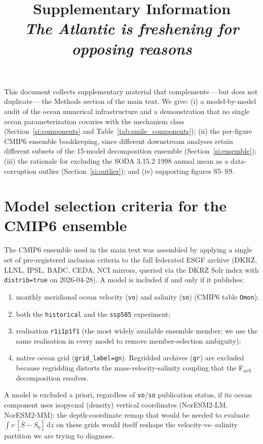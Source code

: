 \documentclass[10pt,a4paper]{article}
\title{Supplementary Information \\
       \textit{The Atlantic is freshening for opposing reasons}}
\date{}
\begin{document}
\maketitle

This document collects supplementary material that complements\,---\,but does
not duplicate\,---\,the Methods section of the main text. We give:
(i) a model-by-model audit of the ocean numerical infrastructure and a
demonstration that no single ocean parameterization covaries with the
mechanism class (Section~\ref{si:components} and Table~\ref{tab:smile_components});
(ii) the per-figure CMIP6 ensemble bookkeeping, since different downstream
analyses retain different subsets of the 15-model decomposition ensemble
(Section~\ref{si:ensemble});
(iii) the rationale for excluding the SODA 3.15.2 1998 annual mean as a
data-corruption outlier (Section~\ref{si:outlier});
and (iv) supporting figures S5--S9.

\section*{Model selection criteria for the CMIP6 ensemble}
\label{si:model_selection}

The CMIP6 ensemble used in the main text was assembled by applying a
single set of pre-registered inclusion criteria to the full federated
ESGF archive (DKRZ, LLNL, IPSL, BADC, CEDA, NCI mirrors, queried via
the DKRZ Solr index with \texttt{distrib=true} on 2026-04-28). A model
is included if and only if it publishes:

\begin{enumerate}
\item monthly meridional ocean velocity (\texttt{vo}) and salinity
      (\texttt{so}) (CMIP6 table \texttt{Omon});
\item both the \texttt{historical} and the \texttt{ssp585} experiment;
\item realisation \texttt{r1i1p1f1} (the most widely available ensemble
      member; we use the same realisation in every model to remove
      member-selection ambiguity);
\item native ocean grid (\texttt{grid\_label=gn}). Regridded archives
      (\texttt{gr}) are excluded because regridding distorts the
      mass-velocity-salinity coupling that the F$_{\mathrm{ovS}}$
      decomposition resolves.
\end{enumerate}

A model is excluded a priori, regardless of \texttt{vo}/\texttt{so}
publication status, if its ocean component uses isopycnal (density)
vertical coordinates (NorESM2-LM, NorESM2-MM): the depth-coordinate
remap that would be needed to evaluate $\int v\,[\bar{S}-S_0]\,
\mathrm{d}z$ on these grids would itself reshape the velocity-vs-
salinity partition we are trying to diagnose.
\end{document}
